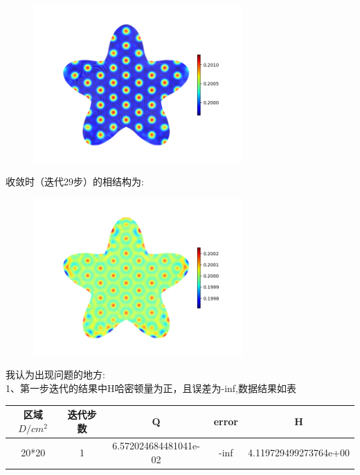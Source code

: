 \documentclass[12pt]{article}
\begin{document}
\begin{CJK}{UTF8}{gkai}
\begin{figure}[H]
	\centering   
	\includegraphics[width=8cm]{scftfigure22.png}
	\caption{}
\end{figure}
收敛时（迭代29步）的相结构为:\\
\begin{figure}[H]
	\centering   
	\includegraphics[width=8cm]{scftfigure28.png}
	\caption{}
\end{figure}   

我认为出现问题的地方:\\

1、第一步迭代的结果中H哈密顿量为正，且误差为-inf,数据结果如表\\
\begin{table}[H]
	\centering
\begin{tabular}{ccccc}
	\toprule
	区域$D/cm^2$ &	迭代步数 & Q&error &  H \\
	\midrule
	20*20&1& 6.572024684481041e-02 &-inf&4.119729499273764e+00 \\
	\bottomrule
\end{tabular}
\end{table}    
 

\end{CJK}
\end{document}
